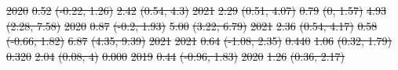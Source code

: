\documentclass[
  letterpaper,
  DIV=11,
  numbers=noendperiod]{scrartcl}
\makeatletter
\renewenvironment{table}%
   {\renewcommand\familydefault\sfdefault
    \@float{table}}
   {\end@float}
\providecommand{\DIFdel}[1]{{\protect\color{red}\sout{#1}}}                      %
\providecommand{\DIFdelFL}[1]{\DIFdel{#1}} %
\makeatother
\begin{document}
\begin{table}
\DIFdelFL{2020 }%
\DIFdelFL{0.52 }%
\DIFdelFL{(-0.22, 1.26) }%
\DIFdelFL{2.42 }%
\DIFdelFL{(0.54, 4.3) }%
\DIFdelFL{2021 }%
\DIFdelFL{2.29 }%
\DIFdelFL{(0.51, 4.07) }%
\DIFdelFL{0.79 }%
\DIFdelFL{(0, 1.57) }%
\DIFdelFL{4.93 }%
\DIFdelFL{(2.28, 7.58) }%
\DIFdelFL{2020 }%
\DIFdelFL{0.87 }%
\DIFdelFL{(-0.2, 1.93) }%
\DIFdelFL{5.00 }%
\DIFdelFL{(3.22, 6.79) }%
\DIFdelFL{2021 }%
\DIFdelFL{2.36 }%
\DIFdelFL{(0.54, 4.17) }%
\DIFdelFL{0.58 }%
\DIFdelFL{(-0.66, 1.82) }%
\DIFdelFL{6.87 }%
\DIFdelFL{(4.35, 9.39) }%
\DIFdelFL{\hspace{1em}2021 }%
\DIFdelFL{2021 }%
\DIFdelFL{0.64 }%
\DIFdelFL{(-1.08, 2.35) }%
\DIFdelFL{0.440 }%
\DIFdelFL{1.06 }%
\DIFdelFL{(0.32, 1.79) }%
\DIFdelFL{0.320 }%
\DIFdelFL{2.04 }%
\DIFdelFL{(0.08, 4) }%
\DIFdelFL{0.000}%
\DIFdelFL{2019 }%
\DIFdelFL{0.44 }%
\DIFdelFL{(-0.96, 1.83) }%
\DIFdelFL{2020 }%
\DIFdelFL{1.26 }%
\DIFdelFL{(0.36, 2.17) }%

\end{table}
\end{document}
